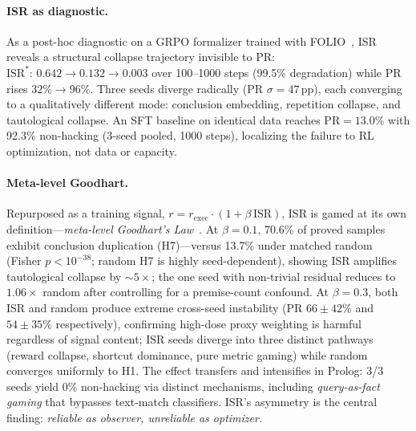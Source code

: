 \paragraph{ISR as diagnostic.}
As a post-hoc diagnostic on a GRPO formalizer trained with FOLIO~\citep{folio}, ISR reveals a structural collapse trajectory invisible to PR: $\text{ISR}^{*}{:}\,0.642\to 0.132\to 0.003$ over 100--1000 steps (99.5\% degradation) while PR rises $32\%{\to}96\%$.
Three seeds diverge radically (PR $\sigma{=}47$\,pp), each converging to a qualitatively different mode: conclusion embedding, repetition collapse, and tautological collapse.
An SFT baseline on identical data reaches $\text{PR}{=}13.0\%$ with 92.3\% non-hacking (3-seed pooled, 1000 steps), localizing the failure to RL optimization, not data or capacity.

\paragraph{Meta-level Goodhart.}
Repurposed as a training signal, $r = r_{\text{exec}} \cdot (1 + \beta\,\text{ISR})$, ISR is gamed at its own definition---\emph{meta-level Goodhart's Law}~\citep{manheim-goodhart-taxonomy, karwowski-goodhart-rl, gao-reward-overoptimization}.
At $\beta{=}0.1$, 70.6\% of proved samples exhibit conclusion duplication (H7)---versus 13.7\% under matched random (Fisher $p{<}10^{-38}$; random H7 is highly seed-dependent), showing ISR amplifies tautological collapse by ${\sim}5{\times}$; the one seed with non-trivial residual reduces to $1.06\times$ random after controlling for a premise-count confound.
At $\beta{=}0.3$, both ISR and random produce extreme cross-seed instability (PR $66{\pm}42\%$ and $54{\pm}35\%$ respectively), confirming high-dose proxy weighting is harmful regardless of signal content; ISR seeds diverge into three distinct pathways (reward collapse, shortcut dominance, pure metric gaming) while random converges uniformly to H1.
The effect transfers and intensifies in Prolog: 3/3 seeds yield 0\% non-hacking via distinct mechanisms, including \emph{query-as-fact gaming} that bypasses text-match classifiers.
ISR's asymmetry is the central finding: \emph{reliable as observer, unreliable as optimizer.}


